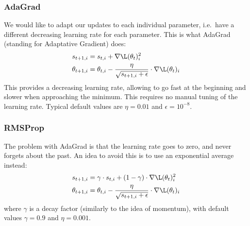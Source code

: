 \subsubsection{AdaGrad}
We would like to adapt our updates to each individual parameter, i.e.~have a different decreasing learning rate for each parameter. This is what AdaGrad (standing for Adaptative Gradient) does:
\begin{equation*}
    \begin{aligned}
        s_{t+1,i} &= s_{t,i} + \nabla\L(\theta_t)_i^2\\
        \theta_{t+1,i} &= \theta_{t,i} - \frac{\eta}{\sqrt{s_{t+1,i}+\epsilon}}\cdot\nabla\L(\theta_t)_i
    \end{aligned}
\end{equation*}
This provides a decreasing learning rate, allowing to go fast at the beginning and slower when approaching the minimum. This requires no manual tuning of the learning rate. Typical default values are $\eta=0.01$ and $\epsilon=10^{-8}$.

\subsubsection{RMSProp}
The problem with AdaGrad is that the learning rate goes to zero, and never forgets about the past. An idea to avoid this is to use an exponential average instead:
\begin{equation*}
    \begin{aligned}
        s_{t+1,i} &= \gamma\cdot s_{t,i} + (1-\gamma)\cdot\nabla\L(\theta_t)_i^2\\
        \theta_{t+1,i} &= \theta_{t,i} - \frac{\eta}{\sqrt{s_{t+1,i}+\epsilon}}\cdot\nabla\L(\theta_t)_i
    \end{aligned}
\end{equation*}
where $\gamma$ is a decay factor (similarly to the idea of momentum), with default values $\gamma=0.9$ and $\eta=0.001$.

